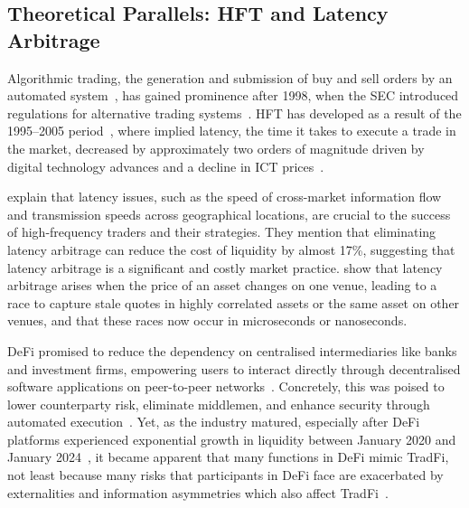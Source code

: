 \documentclass[pdflatex, sn-basic]{sn-jnl}
\theoremstyle{thmstylethree}%
\begin{document}

	\subsection{Theoretical Parallels: {HFT} and Latency Arbitrage}
	\label{subsec:hft-parallels}

	Algorithmic trading, the generation and submission of buy and sell orders by an automated system~\citep{Gomber2013}, has gained prominence after 1998, when the \ac{SEC} introduced regulations for alternative trading systems~\citep{Goldstein2014}.
	\Ac{HFT} has developed as a result of the 1995--2005 period~\citep{Moallemi2013}, where implied latency, the time it takes to execute a trade in the market, decreased by approximately two orders of magnitude driven by digital technology advances and a decline in \ac{ICT} prices~\citep{Zaharudin2021}.

	\citet{Zaharudin2021} explain that latency issues, such as the speed of cross-market information flow and transmission speeds across geographical locations, are crucial to the success of high-frequency traders and their strategies.
	They mention that eliminating latency arbitrage can reduce the cost of liquidity by almost \num{17}\%, suggesting that latency arbitrage is a significant and costly market practice.
	\citet{Aquilina2021} show that latency arbitrage arises when the price of an asset changes on one venue, leading to a race to capture stale quotes in highly correlated assets or the same asset on other venues, and that these races now occur in microseconds or nanoseconds.

	\Ac{DeFi} promised to reduce the dependency on centralised intermediaries like banks and investment firms, empowering users to interact directly through decentralised software applications on peer-to-peer networks~\citep{Bansal2025}.
	Concretely, this was poised to lower counterparty risk, eliminate middlemen, and enhance security through automated execution~\citep{Schueffel2021}.
	Yet, as the industry matured, especially after \ac{DeFi} platforms experienced exponential growth in liquidity between January 2020 and January 2024~\citep{Durachman2024}, it became apparent that many functions in \ac{DeFi} mimic \ac{TradFi}, not least because many risks that participants in \ac{DeFi} face are exacerbated by externalities and information asymmetries which also affect \ac{TradFi}~\citep{Aquilina2021}.
\end{document}
